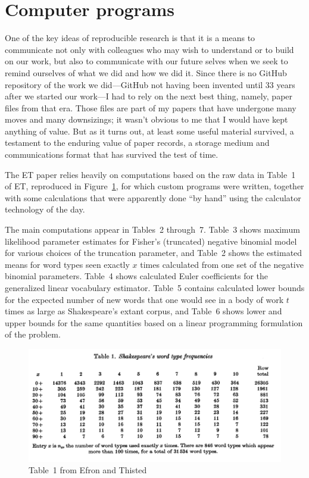 \section{Computer programs} %
\label{sec:computer_programs}

One of the key ideas of reproducible research is that it is a means to communicate not only with colleagues who may wish to understand or to build on our work, but also to communicate with our future selves when we seek to remind ourselves of what we did and how we did it.  Since there is no GitHub repository of the work we did---GitHub not having been invented until 33 years after we started our work---I had to rely on the next best thing, namely, paper files from that era.  Those files are part of my papers that have undergone many moves and many downsizings; it wasn't obvious to me that I would have kept anything of value.  But as it turns out, at least some useful material survived, a testament to the enduring value of paper records, a storage medium and communications format that has survived the test of time.
  
The ET paper relies heavily on computations based on the raw data in Table~1 of ET, reproduced in Figure~\ref{fig:ETT1}, for which custom programs were written, together with some calculations that were apparently done ``by hand'' using the calculator technology of the day.

The main computations appear in Tables~2 through~7.  Table~3 shows maximum likelihood parameter estimates for Fisher's (truncated) negative binomial model for various choices of the truncation parameter, and Table~2 shows the estimated means for word types seen exactly $x$ times calculated from one set of the negative binomial parameters.  Table~4 shows calculated Euler coefficients for the generalized linear vocabulary estimator.  Table~5 contains calculated lower bounds for the expected number of new words that one would see in a body of work $t$ times as large as Shakespeare's extant corpus, and Table~6 shows lower and upper bounds for the same quantities based on a linear programming formulation of the problem.

\begin{figure}
	\centering
	\includegraphics[width=5in]{../compendium/Figures/ET-Table1.pdf}
	\caption{Table~1 from Efron and Thisted \citeyear{Efron:1976zs} }
	\label{fig:ETT1}
\end{figure}

